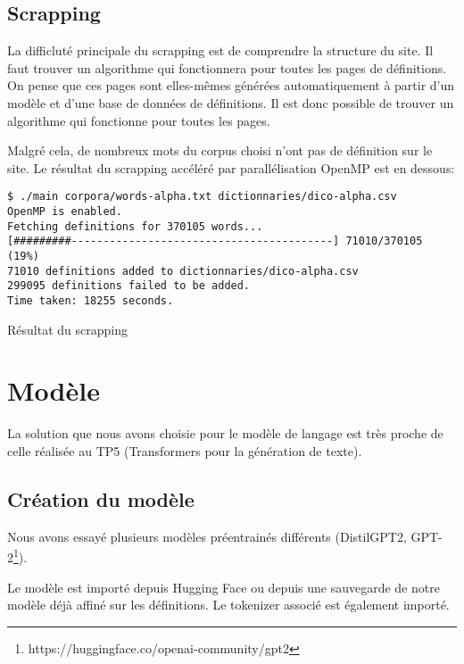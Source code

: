 \documentclass[french]{template}
\begin{document}
\subsection{Scrapping}

La difficluté principale du scrapping est de comprendre la structure du site. Il faut trouver un algorithme qui fonctionnera pour toutes les pages de définitions. On pense que ces pages sont elles-mêmes générées automatiquement à partir d'un modèle et d'une base de données de définitions. Il est donc possible de trouver un algorithme qui fonctionne pour toutes les pages.

Malgré cela, de nombreux mots du corpus choisi n'ont pas de définition sur le site. Le résultat du scrapping accéléré par parallélisation OpenMP est en dessous:

\begin{listing}[H]
    \begin{verbatim}
$ ./main corpora/words-alpha.txt dictionnaries/dico-alpha.csv
OpenMP is enabled.
Fetching definitions for 370105 words...
[#########-----------------------------------------] 71010/370105 (19%)
71010 definitions added to dictionnaries/dico-alpha.csv
299095 definitions failed to be added.
Time taken: 18255 seconds.
\end{verbatim}
    \caption{Résultat du scrapping}
\end{listing}

\section{Modèle}

La solution que nous avons choisie pour le modèle de langage est très proche de celle réalisée au TP5 (Transformers pour la génération de texte).

\subsection{Création du modèle}

Nous avons essayé plusieurs modèles préentrainés différents (DistilGPT2, GPT-2\footnote{https://huggingface.co/openai-community/gpt2}).

Le modèle est importé depuis Hugging Face ou depuis une sauvegarde de notre modèle déjà affiné sur les définitions. Le tokenizer associé est également importé.
\end{document}
